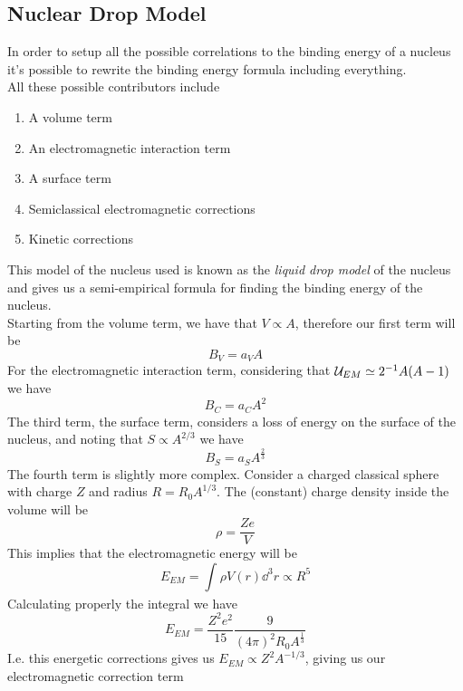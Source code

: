 \documentclass[../qm.tex]{subfiles}
\begin{document}
\subsection{Nuclear Drop Model}
In order to setup all the possible correlations to the binding energy of a nucleus it's possible to rewrite the binding energy formula including everything.\\
All these possible contributors include
\begin{enumerate}
\item A volume term
\item An electromagnetic interaction term
\item A surface term
\item Semiclassical electromagnetic corrections
\item Kinetic corrections
\end{enumerate}
This model of the nucleus used is known as the \emph{liquid drop model} of the nucleus and gives us a semi-empirical formula for finding the binding energy of the nucleus.\\
Starting from the volume term, we have that $V\propto A$, therefore our first term will be
\begin{equation*}
	B_V=a_VA
\end{equation*}
For the electromagnetic interaction term, considering that $\mathcal{U}_{EM}\simeq 2^{-1}A(A-1)$ we have
\begin{equation*}
	B_{C}=a_CA^2
\end{equation*}
The third term, the surface term, considers a loss of energy on the surface of the nucleus, and noting that $S\propto A^{2/3}$ we have
\begin{equation*}
	B_S=a_SA^{\frac{2}{3}}
\end{equation*}
The fourth term is slightly more complex. Consider a charged classical sphere with charge $Z$ and radius $R=R_0A^{1/3}$. The (constant) charge density inside the volume will be
\begin{equation*}
	\rho=\frac{Ze}{V}
\end{equation*}
This implies that the electromagnetic energy will be
\begin{equation*}
	E_{EM}=\int_{}^{}\rho V(r)\dd^3r\propto R^5
\end{equation*}
Calculating properly the integral we have
\begin{equation*}
	E_{EM}=\frac{Z^2e^2}{15}\frac{9}{(4\pi)^2R_0A^{\frac{1}{3}}}
\end{equation*}
I.e. this energetic corrections gives us $E_{EM}\propto Z^2A^{-1/3}$, giving us our electromagnetic correction term
\end{document}
